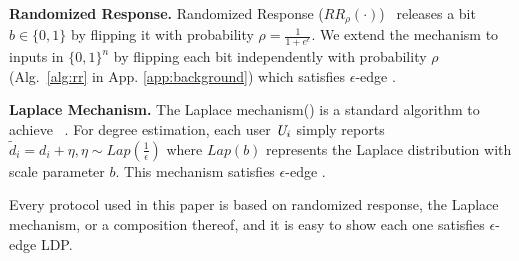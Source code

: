 
\noindent\textbf{Randomized Response.} Randomized Response ($RR_\rho(\cdot)$)~\cite{RR} releases a bit $b \in \{0,1\}$ by
flipping it with probability $\rho = \frac{1}{1+e^\epsilon}$. We extend the
mechanism to inputs in $\{0,1\}^n$ by flipping each bit independently with
probability $\rho$ (Alg.~\ref{alg:rr} in App. \ref{app:background}) which satisfies
 $\epsilon$-edge \DP. 
 
\noindent\textbf{Laplace Mechanism.} 
The Laplace mechanism(\RLap) is a standard algorithm to achieve \DP~\cite{Dwork}. For degree estimation, each user $\textit{U}_i$ simply reports $\tilde{d}_i=d_i+\eta, \eta \sim Lap(\frac{1}{\epsilon})$ where $Lap(b)$ represents the Laplace distribution with scale parameter $b$. This mechanism satisfies $\epsilon$-edge \DP. 

Every protocol used in this paper is based on randomized response, the Laplace mechanism, or a composition thereof, and it is easy to show each one satisfies $\epsilon$-edge LDP.

